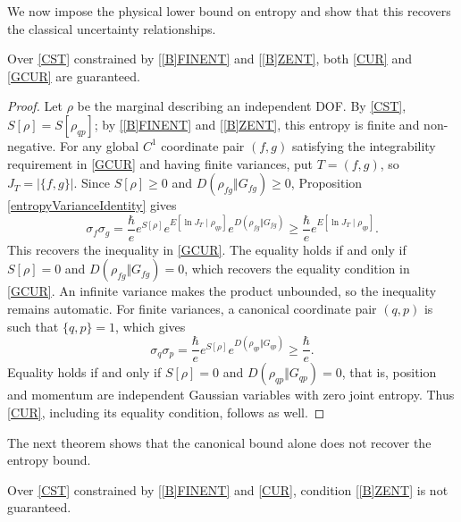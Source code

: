 \documentclass{techbrief}
\begin{document}
We now impose the physical lower bound on entropy and show that this recovers the classical uncertainty relationships.

\begin{thrm}\label{entropyImpliesUncertainty}
	Over \ref{CST} constrained by \ref{[B]FINENT} and \ref{[B]ZENT}, both \ref{CUR} and \ref{GCUR} are guaranteed.
\end{thrm}

\begin{proof}
	Let $\rho$ be the marginal describing an independent DOF. By \ref{CST}, $S[\rho]=S[\rho_{qp}]$; by \ref{[B]FINENT} and \ref{[B]ZENT}, this entropy is finite and non-negative. For any global $C^1$ coordinate pair $(f,g)$ satisfying the integrability requirement in \ref{GCUR} and having finite variances, put $T=(f,g)$, so $J_T=|\{f,g\}|$. Since $S[\rho]\geq0$ and $D(\rho_{fg}\Vert G_{fg})\geq0$, Proposition \ref{entropyVarianceIdentity} gives
	\begin{equation*}
		\sigma_f\sigma_g=\frac{\hbar}{e}e^{S[\rho]}e^{E[\ln J_T\mid\rho_{qp}]}e^{D(\rho_{fg}\Vert G_{fg})}\geq\frac{\hbar}{e}e^{E[\ln J_T\mid\rho_{qp}]}.
	\end{equation*}
	This recovers the inequality in \ref{GCUR}. The equality holds if and only if $S[\rho]=0$ and $D(\rho_{fg}\Vert G_{fg})=0$, which recovers the equality condition in \ref{GCUR}. An infinite variance makes the product unbounded, so the inequality remains automatic. For finite variances, a canonical coordinate pair $(q,p)$ is such that $\{q,p\} = 1$, which gives
	\begin{equation}\label{rp-cm-classicalUncertaintyRelation}
		\sigma_q\sigma_p=\frac{\hbar}{e}e^{S[\rho]}e^{D(\rho_{qp}\Vert G_{qp})}\geq\frac{\hbar}{e}.
	\end{equation}
	Equality holds if and only if $S[\rho]=0$ and $D(\rho_{qp}\Vert G_{qp})=0$, that is, position and momentum are independent Gaussian variables with zero joint entropy. Thus \ref{CUR}, including its equality condition, follows as well.
\end{proof}

The next theorem shows that the canonical bound alone does not recover the entropy bound.

\begin{thrm}
	Over \ref{CST} constrained by \ref{[B]FINENT} and \ref{CUR}, condition \ref{[B]ZENT} is not guaranteed.
\end{thrm}
\end{document}
